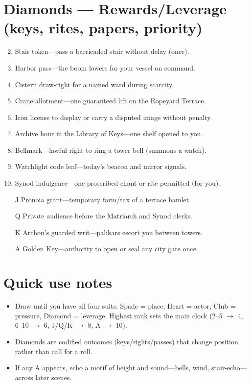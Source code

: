 \section*{Diamonds --- Rewards/Leverage (keys, rites, papers, priority)}
\begin{enumerate}
\setcounter{enumi}{1}
\item Stair token---pass a barricaded stair without delay (once).
\item Harbor pass---the boom lowers for your vessel on command.
\item Cistern draw-right for a named ward during scarcity.
\item Crane allotment---one guaranteed lift on the Ropeyard Terrace.
\item Icon license to display or carry a disputed image without penalty.
\item Archive hour in the Library of Keys---one shelf opened to you.
\item Bellmark---lawful right to ring a tower bell (summons a watch).
\item Watchlight code leaf---today's beacon and mirror signals.
\item Synod indulgence---one proscribed chant or rite permitted (for you).
\item[J] Pronoia grant---temporary farm/tax of a terrace hamlet.
\item[Q] Private audience before the Matriarch and Synod clerks.
\item[K] Archon's guarded writ---palikars escort you between towers.
\item[A] Golden Key---authority to open or seal any city gate once.
\end{enumerate}

\section*{Quick use notes}
\begin{itemize}
\item Draw until you have all four suits: Spade = place, Heart = actor, Club = pressure, Diamond = leverage. Highest rank sets the main clock (2--5 $\rightarrow$ 4, 6--10 $\rightarrow$ 6, J/Q/K $\rightarrow$ 8, A $\rightarrow$ 10).
\item Diamonds are codified outcomes (keys/rights/passes) that change position rather than call for a roll.
\item If any A appears, echo a motif of height and sound---bells, wind, stair-echo---across later scenes.
\end{itemize}
